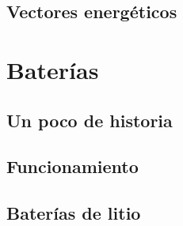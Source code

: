 \subsection{Vectores energéticos}

\section{Baterías}

\subsection{Un poco de historia}
\subsection{Funcionamiento}
\subsection{Baterías de litio}

